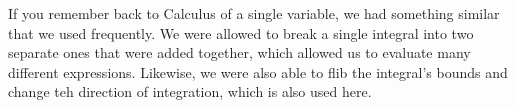 \begin{remark*}
  If you remember back to Calculus of a single variable, we had something similar that we used frequently.
  We were allowed to break a single integral into two separate ones that were added together, which allowed us to evaluate many different expressions.
  Likewise, we were also able to flib the integral's bounds and change teh direction of integration, which is also used here.
\end{remark*}

